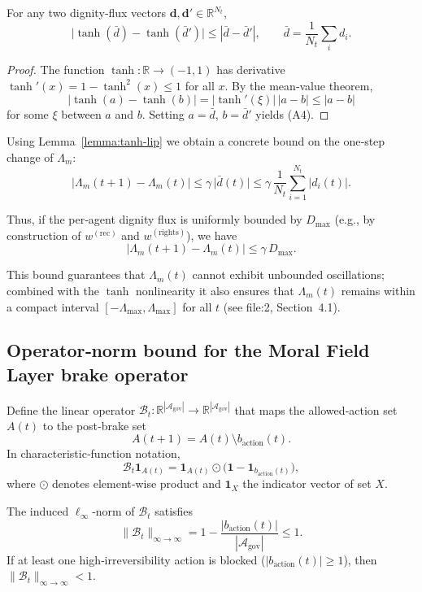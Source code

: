 \documentclass[11pt]{article}
\begin{document}
\begin{lemma}
For any two dignity‑flux vectors $\mathbf{d},\mathbf{d}'\in\mathbb{R}^{N_t}$,
\[
\big|\tanh(\bar{d})-\tanh(\bar{d}')\big|
\le |\bar{d}-\bar{d}'| ,
\qquad
\bar{d}=\frac{1}{N_t}\sum_i d_i .
\tag{A4}
\]
\end{lemma}

\begin{proof}
The function $\tanh:\mathbb{R}\to(-1,1)$ has derivative $\tanh'(x)=1-\tanh^2(x)\le1$ for all $x$. By the mean‑value theorem,
\[
|\tanh(a)-\tanh(b)|
=| \tanh'(\xi) |\,|a-b|
\le |a-b|
\]
for some $\xi$ between $a$ and $b$. Setting $a=\bar{d}$, $b=\bar{d}'$ yields (A4).
\end{proof}

Using Lemma~\ref{lemma:tanh-lip} we obtain a concrete bound on the one‑step change of $\Lambda_m$:
\[
\big|\Lambda_m(t+1)-\Lambda_m(t)\big|
\le \gamma\,\big|\bar{d}(t)\big|
\le \gamma\,\frac{1}{N_t}\sum_{i=1}^{N_t}|d_i(t)|.
\tag{A5}
\]

Thus, if the per‑agent dignity flux is uniformly bounded by $D_{\max}$ (e.g., by construction of $w^{(\text{rec})}$ and $w^{(\text{rights})}$), we have
\[
\big|\Lambda_m(t+1)-\Lambda_m(t)\big|
\le \gamma\,D_{\max}.
\tag{A6}
\]

This bound guarantees that $\Lambda_m(t)$ cannot exhibit unbounded oscillations; combined with the $\tanh$ nonlinearity it also ensures that $\Lambda_m(t)$ remains within a compact interval $[-\Lambda_{\max},\Lambda_{\max}]$ for all $t$ (see file:2, Section~4.1).

\subsection{Operator‑norm bound for the Moral Field Layer brake operator}
Define the linear operator $\mathcal{B}_t:\mathbb{R}^{|\mathcal{A}_{\text{gov}}|}\to\mathbb{R}^{|\mathcal{A}_{\text{gov}}|}$ that maps the allowed‑action set $A(t)$ to the post‑brake set
\[
A(t+1)=A(t)\setminus b_{\text{action}}(t).
\]
In characteristic‑function notation,
\[
\mathcal{B}_t\mathbf{1}_{A(t)} = \mathbf{1}_{A(t)}\odot\big(\mathbf{1}-\mathbf{1}_{b_{\text{action}}(t)}\big),
\]
where $\odot$ denotes element‑wise product and $\mathbf{1}_{X}$ the indicator vector of set $X$.

\begin{lemma}
The induced $\ell_\infty$‑norm of $\mathcal{B}_t$ satisfies
\[
\|\mathcal{B}_t\|_{\infty\to\infty}=1-\frac{|b_{\text{action}}(t)|}{|\mathcal{A}_{\text{gov}}|}\le 1 .
\tag{A7}
\]
If at least one high‑irreversibility action is blocked ($|b_{\text{action}}(t)|\ge1$), then $\|\mathcal{B}_t\|_{\infty\to\infty}<1$.
\end{lemma}
\end{document}

